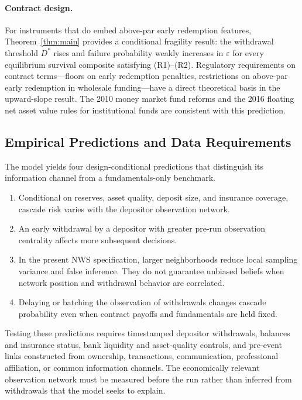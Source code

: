 \documentclass[12pt]{article}\usepackage[]{graphicx}\usepackage[]{xcolor}
\begin{document}
\paragraph{Contract design.}
For instruments that do embed above-par early redemption features, Theorem~\ref{thm:main} provides a conditional fragility result: the withdrawal threshold $D^*$ rises and failure probability weakly increases in $\varepsilon$ for every equilibrium survival composite satisfying (R1)--(R2).
Regulatory requirements on contract terms---floors on early redemption penalties, restrictions on above-par early redemption in wholesale funding---have a direct theoretical basis in the upward-slope result.
The 2010 money market fund reforms and the 2016 floating net asset value rules for institutional funds are consistent with this prediction.

\subsection{Empirical Predictions and Data Requirements}
\label{sec:predictions}

The model yields four design-conditional predictions that distinguish its information channel from a fundamentals-only benchmark.
\begin{enumerate}
  \item Conditional on reserves, asset quality, deposit size, and
    insurance coverage, cascade risk varies with the depositor
    observation network.
  \item An early withdrawal by a depositor with greater pre-run
    observation centrality affects more subsequent decisions.
  \item In the present NWS specification, larger neighborhoods reduce
    local sampling variance and false inference. They do not guarantee
    unbiased beliefs when network position and withdrawal behavior are
    correlated.
  \item Delaying or batching the observation of withdrawals changes
    cascade probability even when contract payoffs and fundamentals
    are held fixed.
\end{enumerate}

Testing these predictions requires timestamped depositor withdrawals, balances and insurance status, bank liquidity and asset-quality controls, and pre-event links constructed from ownership, transactions, communication, professional affiliation, or common information channels.
The economically relevant observation network must be measured before the run rather than inferred from withdrawals that the model seeks to explain.
\end{document}
